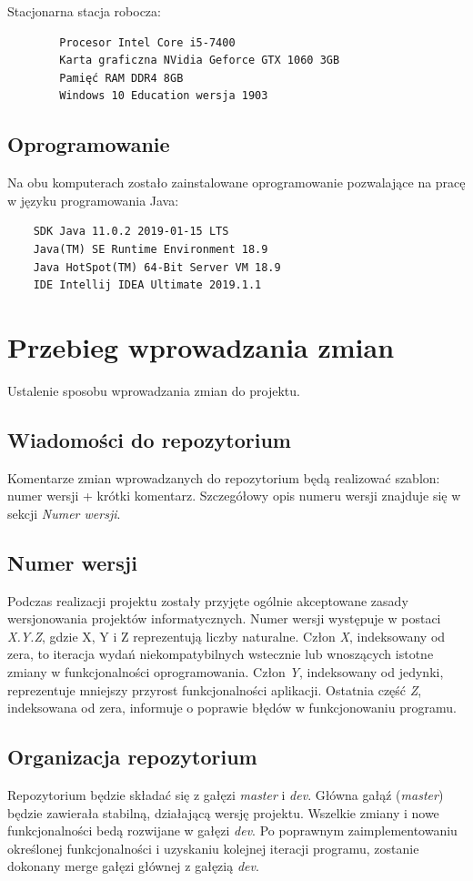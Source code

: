 \documentclass{article}
\begin{document}
    Stacjonarna stacja robocza:
\vspace{-8pt}        
\begin{verbatim}
        Procesor Intel Core i5-7400
        Karta graficzna NVidia Geforce GTX 1060 3GB
        Pamięć RAM DDR4 8GB
        Windows 10 Education wersja 1903
\end{verbatim}

\subsection{Oprogramowanie}

Na obu komputerach zostało zainstalowane oprogramowanie pozwalające na pracę w języku programowania Java:

\begin{verbatim}
    SDK Java 11.0.2 2019-01-15 LTS
    Java(TM) SE Runtime Environment 18.9
    Java HotSpot(TM) 64-Bit Server VM 18.9
    IDE Intellij IDEA Ultimate 2019.1.1 
\end{verbatim}

\section{Przebieg wprowadzania zmian}
Ustalenie sposobu wprowadzania zmian do projektu.

\subsection{Wiadomości do repozytorium}
Komentarze zmian wprowadzanych do repozytorium będą realizować szablon: numer wersji + krótki komentarz. Szczegółowy opis numeru wersji znajduje się w sekcji \textit{Numer wersji}.

\subsection{Numer wersji}
Podczas realizacji projektu zostały przyjęte ogólnie akceptowane zasady wersjonowania projektów informatycznych. Numer wersji występuje w postaci \textit{X.Y.Z}, gdzie X, Y i Z reprezentują liczby naturalne. Człon \textit{X}, indeksowany od zera, to iteracja wydań niekompatybilnych wstecznie lub wnoszących istotne zmiany w funkcjonalności oprogramowania. Człon \textit{Y}, indeksowany od jedynki, reprezentuje mniejszy przyrost funkcjonalności aplikacji. Ostatnia część \textit{Z}, indeksowana od zera, informuje o poprawie błędów w funkcjonowaniu programu.

\subsection{Organizacja repozytorium}
Repozytorium będzie składać się z gałęzi \textit{master} i \textit{dev}. Główna gałąź (\textit{master}) będzie zawierała stabilną, działającą wersję projektu. Wszelkie zmiany i nowe funkcjonalności bedą rozwijane w gałęzi \textit{dev}. Po poprawnym zaimplementowaniu określonej funkcjonalności i uzyskaniu kolejnej iteracji programu, zostanie dokonany merge gałęzi głównej z gałęzią \textit{dev}.
\end{document}
